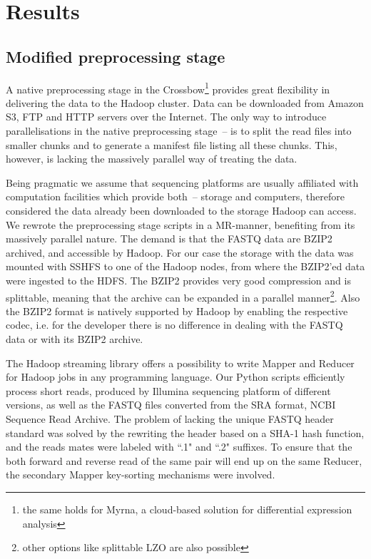 \documentclass[11pt, oneside]{article}   	%
\begin{document}
\section{Results}
\label{sectionIII}

\subsection{Modified preprocessing stage}
A native preprocessing stage in the Crossbow\footnote{the same holds for Myrna, a cloud-based solution for differential expression analysis} provides great flexibility in delivering the data to the Hadoop cluster.  Data can be downloaded from Amazon S3, FTP and HTTP servers over the Internet\cite{crossbow}. The only way to introduce parallelisations in the native preprocessing stage~-- is to split the read files into smaller chunks and to generate a manifest file listing all these chunks. This, however, is lacking the massively parallel way of treating the data.

Being  pragmatic we assume that sequencing platforms are usually affiliated with computation facilities which provide both~--  storage and  computers,  
therefore considered the data already been downloaded to the storage Hadoop can access.
We rewrote the preprocessing stage scripts in a MR-manner, benefiting from its massively parallel nature.
The demand is that the FASTQ data are BZIP2 archived, and  accessible by Hadoop. For our case the storage with the data was mounted with SSHFS to one of the Hadoop nodes, from where the BZIP2'ed data were ingested to the HDFS.
The BZIP2 provides very good compression and is splittable, meaning that the archive can be expanded in a parallel manner\footnote{other options like splittable LZO are also possible}. Also the BZIP2 format is natively supported by Hadoop by enabling the respective codec, i.e. for the developer there is no difference in dealing with the FASTQ data or with its BZIP2 archive.

The Hadoop streaming library offers a possibility to write  Mapper and Reducer for Hadoop jobs in any  programming language. Our Python scripts efficiently process  short reads, produced by  Illumina sequencing platform of different versions, as well as the FASTQ files converted from the SRA format, NCBI Sequence Read Archive. 
The problem of lacking the unique FASTQ header standard was solved by the rewriting the header based on a SHA-1 hash function, and the reads mates were labeled with ``.1" and ``.2" suffixes. 
To ensure that the both forward and reverse read of the same pair will end up on the same Reducer, the secondary Mapper key-sorting mechanisms were involved.
\end{document}

